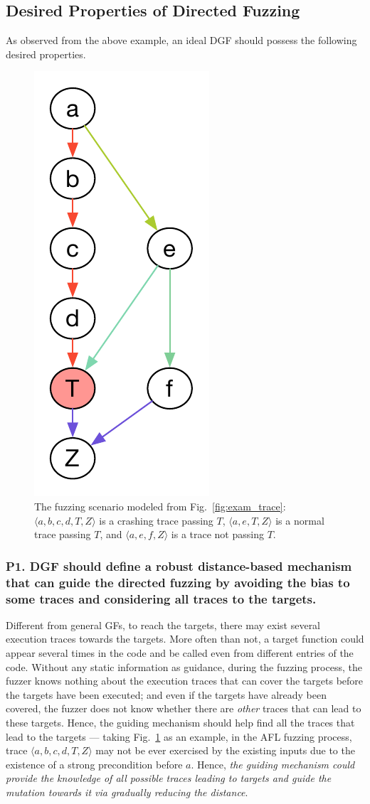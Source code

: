 \subsection{Desired Properties of Directed Fuzzing} \label{subsec:dp}





As observed from the above example, an ideal DGF should possess the following desired properties.




\begin{figure}[t]
	\centering
	\includegraphics[width=0.16\columnwidth]{res/dfot/eg_callchain.pdf}
	\vspace{-5pt}
	\caption{The fuzzing scenario modeled from Fig.~\ref{fig:exam_trace}: $\langle a, b, c, d, T, Z\rangle $ is a crashing trace passing $T$,  $\langle a, e, T, Z\rangle$ is a normal trace passing $T$, and $\langle a, e, f , Z\rangle$ is a trace not passing $T$.}
	\label{fig:call_chain}
\end{figure}

\subsubsection{\textbf{P1}. DGF should define a \textbf{robust} distance-based mechanism that can guide the directed fuzzing by avoiding the bias to some traces and considering all traces to the targets.}  \label{subsec:p1}
Different from general GFs, to reach the targets, there may exist several execution traces towards the targets. More often than not, a target function could appear several times in the code and be called even from different entries of the code. Without any static information as guidance, during the fuzzing process, the fuzzer knows nothing about the execution traces that can cover the targets before the targets have been executed; and even if the targets have already been covered, the fuzzer does not know whether there are \emph{other} traces that can lead to these targets.  Hence, the guiding mechanism should help find all the traces that lead to the targets --- taking Fig.~\ref{fig:call_chain} as an example, in the AFL fuzzing process, trace $\langle a, b, c, d, T, Z\rangle$  may not be ever exercised by the existing inputs due to the existence of a strong precondition before $a$. Hence, \emph{the guiding mechanism could provide the knowledge of all possible traces leading to targets and guide the mutation towards it via gradually reducing the distance}. 

